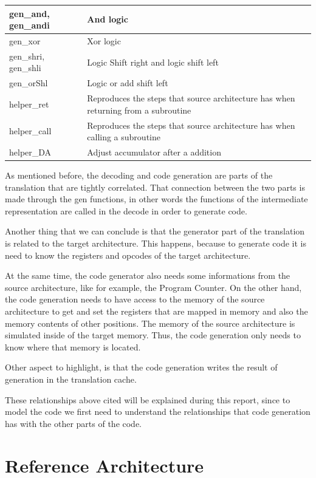 \documentclass[11pt]{report}
\begin{document}
\begin{table}[H]
\begin{tabular}{|l|p{10cm}|}
			gen\_and, gen\_andi				  &	And logic \\ \hline 
			gen\_xor						  &	Xor logic \\ \hline 
			gen\_shri, gen\_shli			  &	Logic Shift right and logic shift left \\ \hline 
			gen\_orShl 						  &	Logic or add shift left\\ \hline 
			helper\_ret 					  & Reproduces the steps that source architecture has when returning from a subroutine	\\ \hline 
			helper\_call 					  & Reproduces the steps that source architecture has when calling a subroutine	\\ \hline 
			helper\_DA						  &	Adjust accumulator after a addition \\ \hline 
		\end{tabular}
	\end{table} 
	
	As mentioned before, the decoding and code generation are parts of the translation that are tightly correlated. That connection between the two parts is made through the gen functions, in other words the functions of the intermediate representation are called in the decode in order to generate code.
	
	Another thing that we can conclude is that the generator part of the translation is related to the target architecture. This happens, because to generate code it is need to know the registers and opcodes of the target architecture.
	
	At the same time, the code generator also needs some informations from the source architecture, like for example, the Program Counter.  On the other hand, the code generation needs to have access to the memory of the source architecture to get and set the registers that are mapped in memory and also the memory contents of other positions. The memory of the source architecture is simulated inside of the target memory.  Thus, the code generation only needs to know where that memory is located.
	
	Other aspect to highlight, is that the code generation writes the result of generation in the translation cache.
	
	These relationships above cited will be explained during this report, since to model the code we first need to understand the relationships that code generation has with the other parts of the code.


	\section{Reference Architecture}
	
\end{document}
